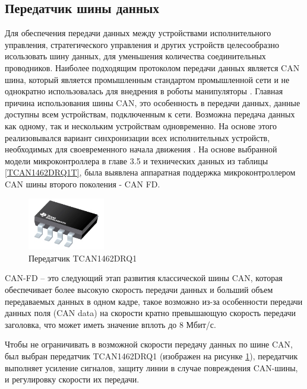\subsection{Передатчик шины данных}
Для обеспечения передачи данных между устройствами исполнительного управления, стратегического управления и других устройств целесообразно исользовать шину данных, для уменьшения количества соединительных проводников. Наиболее подходящим протоколом передачи данных является CAN шина, который является промышленным стандартом промышленной сети и не однократно использовалась для внедрения в роботы манипуляторы \citep{Megalingam2021}.
Главная причина использования шины CAN, это особенность в передачи данных, данные доступны всем устройствам, подключенным к сети. Возможна передача данных как одному, так и нескольким устройствам одновременно. На основе этого реализовывался вариант синхронизации всех исполнительных устройств, необходимых для своевременного начала движения \citep{stmfdcan}.
На основе выбранной модели микроконтроллера в главе 3.5 и технических данных из таблицы \ref{TCAN1462DRQ1T}, была выявлена аппаратная поддержка микроконтроллером CAN шины второго поколения - CAN FD.

\begin{figure}[H]
	\centering
	\includegraphics[width=0.3\textwidth]{Src/images/Trans.png}
	\caption{Передатчик TCAN1462DRQ1}
	\label{TCAN1462DRQ1}
\end{figure}

CAN-FD – это следующий этап развития классической шины CAN, которая обеспечивает более высокую скорость передачи данных и больший объем передаваемых данных в одном кадре, такое возможно из-за особенности передачи данных поля (CAN data) на скорости кратно превышающую скорость передачи заголовка, что может иметь значение вплоть до 8 Мбит/с.

Чтобы не ограничивать в возможной скорости передачу данных по шине CAN, был выбран передатчик TCAN1462DRQ1 (изображен на рисунке \ref{TCAN1462DRQ1}), передатчик выполняет усиление сигналов, защиту линии в случае повреждения CAN-шины, и регулировку скорости их передачи.


